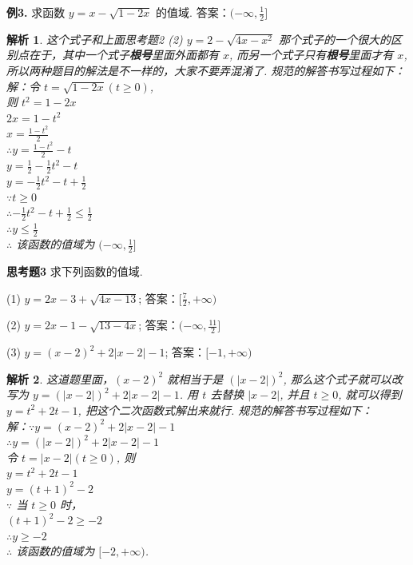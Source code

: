 \documentclass{article}
\theoremstyle{plain}
\newtheorem{aly}{解析}
\begin{document}
\textbf{例3.} 求函数 $y=x-\sqrt{1-2x}$ 的值域. \hspace{25pt} 答案：$(-\infty, \frac{1}{2}]$
\begin{aly}
  这个式子和上面思考题2 (2)  $y=2-\sqrt{4x-x^2}$ 那个式子的一个很大的区别点在于，其中一个式子\textbf{根号}里面外面都有 $x$, 而另一个式子只有\textbf{根号}里面才有 $x$, 所以两种题目的解法是不一样的，大家不要弄混淆了. 规范的解答书写过程如下：\\
  解：令 $t=\sqrt{1-2x} (t \geqslant 0)$, \\
  则 $t^2=1-2x$\\
  $2x=1-t^2$\\
  $x=\frac{1-t^2}{2}$\\
  $\therefore y=\frac{1-t^2}{2}-t$\\
  $y=\frac{1}{2}-\frac{1}{2}t^2-t$\\
  $y=-\frac{1}{2}t^2-t+\frac{1}{2}$\\
  $\because t \geqslant 0$\\
  $\therefore -\frac{1}{2}t^2-t+\frac{1}{2} \leqslant \frac{1}{2}$\\
  $\therefore y \leqslant \frac{1}{2}$\\
  $\therefore$ 该函数的值域为 $(-\infty, \frac{1}{2}]$
\end{aly}

\textbf{思考题3} 求下列函数的值域.

(1) $y=2x-3+\sqrt{4x-13}$; \hspace{25pt} 答案：$[\frac{7}{2}, +\infty)$

(2) $y=2x-1-\sqrt{13-4x}$; \hspace{25pt} 答案：$(-\infty, \frac{11}{2}]$

(3) $y=(x-2)^2+2|x-2|-1$; \hspace{25pt} 答案：$[-1, +\infty)$

\begin{aly}
  这道题里面，$(x-2)^2$ 就相当于是 $(|x-2|)^2$, 那么这个式子就可以改写为 $y=(|x-2|)^2+2|x-2|-1$. 用 $t$ 去替换 $|x-2|$, 并且 $t \geqslant 0$, 就可以得到 $y=t^2+2t-1$, 把这个二次函数式解出来就行.  规范的解答书写过程如下：\\
  解：$\because y=(x-2)^2+2|x-2|-1$\\
  $\therefore y=(|x-2|)^2+2|x-2|-1$\\
  令 $t=|x-2| (t \geqslant 0)$, 则\\
  $y=t^2+2t-1$\\
  $y=(t+1)^2-2$\\
  $\because$ 当 $t \geqslant 0$ 时，\\
  $(t+1)^2-2 \geqslant -2$\\
  $\therefore y \geqslant -2$\\
  $\therefore$ 该函数的值域为 $[-2, +\infty)$.
\end{aly}
\end{document}
